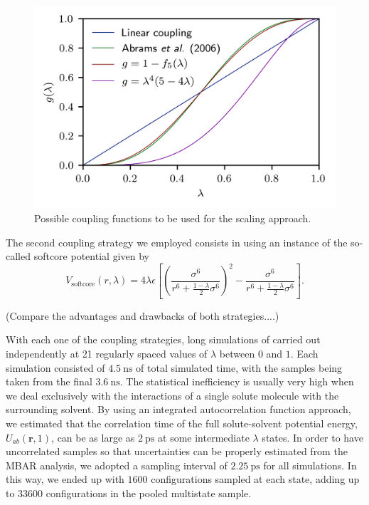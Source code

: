 \documentclass[
aip,
jcp,
reprint,
]{revtex4-1}
\newcommand{\vt}[1]{\boldsymbol{\mathbf{#1}}}          %
\begin{document}
\begin{figure}
	\centering
	\includegraphics{coupling_functions}
	\caption{Possible coupling functions to be used for the scaling approach.}
	\label{fig:coupling functions}
\end{figure}

The second coupling strategy we employed consists in using an instance of the so-called softcore potential \cite{Beutler_1994} given by
\begin{equation*}
V_\mathrm{softcore}(r,\lambda) = 4 \lambda \epsilon \left[\left(\frac{\sigma^6}{r^6 + \frac{1-\lambda}{2}\sigma^6}\right)^2 - \frac{\sigma^6}{r^6 + \frac{1-\lambda}{2}\sigma^6}\right].
\end{equation*}

(Compare the advantages and drawbacks of both strategies....)

With each one of the coupling strategies, long simulations of carried out independently at 21 regularly spaced values of $\lambda$ between $0$ and $1$.
Each simulation consisted of $4.5~\mathrm{ns}$ of total simulated time, with the samples being taken from the final $3.6~\mathrm{ns}$.
The statistical inefficiency is usually very high when we deal exclusively with the interactions of a single solute molecule with the surrounding solvent.
By using an integrated autocorrelation function approach, \cite{Chodera_2007} we estimated that the correlation time of the full solute-solvent potential energy, $U_{ab}(\vt r, 1)$, can be as large as $2~\mathrm{ps}$ at some intermediate $\lambda$ states.
In order to have uncorrelated samples so that uncertainties can be properly estimated from the MBAR analysis, we adopted a sampling interval of $2.25~\mathrm{ps}$ for all simulations.
In this way, we ended up with $1600$ configurations sampled at each state, adding up to $33600$ configurations in the pooled multistate sample.
\end{document}
